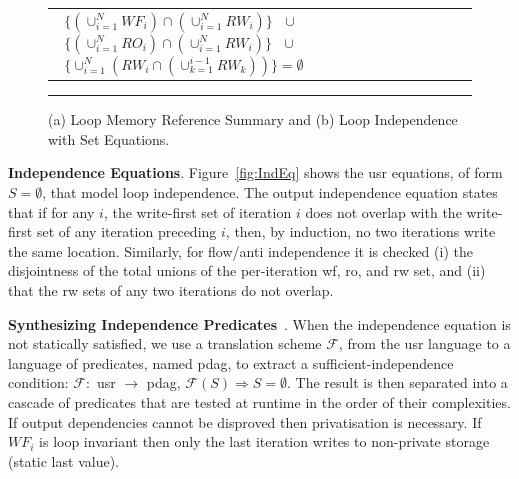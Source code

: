 \documentclass{sig-alternate}
\begin{document}
\begin{figure}[t]
\begin{tabular}{l r}
{{{{$\mbox{ }\{(\cup_{i=1}^{N}WF_i) \cap (\cup_{i=1}^{N}RW_i)\} \mbox{ }\cup\mbox{ }$ \vspace{1ex} \newline
$\mbox{ }\{(\cup_{i=1}^{N}RO_i) \cap (\cup_{i=1}^{N}RW_i)\} \mbox{ }\cup\mbox{ }$ \vspace{1ex} \newline
$\mbox{ }\{ \cup_{i=1}^{N}(RW_i \cap (\cup_{k=1}^{i-1}RW_k))\}=\emptyset$ \newline
}
		}
	  } 
	} 
\end{tabular}
\hrule
\caption{ (a) Loop Memory Reference Summary and (b) Loop Independence with Set Equations.}
\label{fig:UsrEq} %
\end{figure}

\vspace{1ex}

{\bf Independence Equations}. Figure~\ref{fig:IndEq} shows the {\sc usr}
equations, of form $S=\emptyset$, that model loop independence. 
The output independence equation
states that if for any $i$, the write-first set of iteration $i$
does not overlap with the write-first set of any iteration preceding
$i$, then, by induction, no two  iterations write the same %
location. Similarly, for flow/anti independence it is checked 
(i) the disjointness of the total unions of the per-iteration {\sc wf}, 
{\sc ro}, and {\sc rw} set, and (ii) that the {\sc rw} sets of any two 
iterations do not overlap.

\vspace{1ex}

{\bf Synthesizing Independence Predicates}~\cite{CosPLDI}. %
When the independence equation
is not statically satisfied, we use a translation scheme $\mathcal{F}$,
from the {\sc usr} language to a language of %
predicates, named {\sc pdag}, to extract a sufficient-independence condition: 
$\mathcal{F} : $ {\sc usr} $\rightarrow$ {\sc pdag},  
$\mathcal{F}(S) \Rightarrow S = \emptyset$. The result is then separated
into a cascade of predicates that are tested at runtime in the order of 
their complexities.  
If output dependencies cannot be disproved then privatisation is
necessary. If $WF_i$ is loop invariant then only the last iteration 
writes to non-private storage (static last value).

\vspace{1ex}
\end{document}
